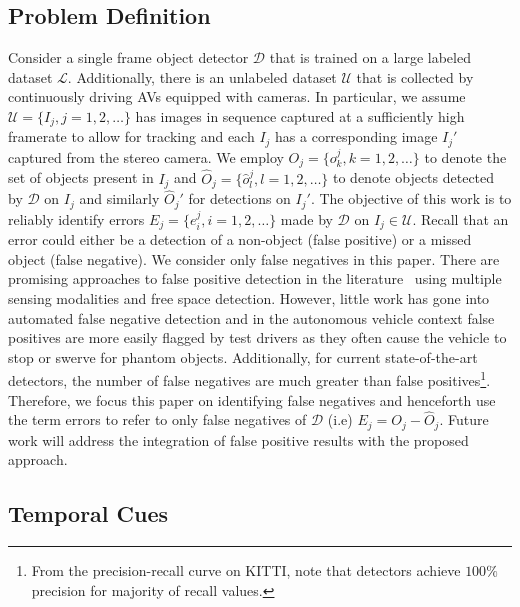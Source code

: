 \documentclass[letterpaper, 10 pt, journal, twoside]{IEEEtran}  %
\begin{document}
\subsection{Problem Definition}
Consider a single frame object detector $\mathcal{D}$ that is trained on a large labeled dataset $\mathcal{L}$. Additionally, there is an unlabeled dataset $\mathcal{U}$ that is collected by continuously driving AVs equipped with cameras. In particular, we assume $\mathcal{U} = \{ I_j, j = 1,2,\ldots \}$ has images in sequence captured at a sufficiently high framerate to allow for tracking and each $I_j$ has a corresponding image $I_j'$ captured from the stereo camera. We employ $O_j = \{o_k^j, k=1,2,\ldots\}$ to denote the set of objects present in $I_j$ and $\hat{O}_j = \{\hat{o}_l^j, l=1,2,\ldots\}$ to denote objects detected by $\mathcal{D}$ on $I_j$ and similarly $\hat{O}_j'$ for detections on $I_j'$. The objective of this work is to reliably identify errors $E_j = \{e_i^j,i=1,2,\ldots\}$ made by $\mathcal{D}$ on $I_j \in \mathcal{U}$.
Recall that an error could either be a detection of a non-object (false positive) or a missed object (false negative). We consider only false negatives in this paper. There are promising approaches to false positive detection in the literature~\cite{barnes2017find} using multiple sensing modalities and free space detection. However, little work has gone into automated false negative detection and in the autonomous vehicle context false positives are more easily flagged by test drivers as they often cause the vehicle to stop or swerve for phantom objects. Additionally, for current state-of-the-art detectors, the number of false negatives are much greater than false positives\footnote{From the precision-recall curve on KITTI, note that detectors achieve $100\%$ precision for majority of recall values.}. 
Therefore, we focus this paper on identifying false negatives and henceforth use the term errors to refer to only false negatives of $\mathcal{D}$ (i.e) $E_j = O_j-\hat{O}_j$. Future work will address the integration of false positive results with the proposed approach.

\subsection{Temporal Cues}
\label{subsec:temporal}
\end{document}
